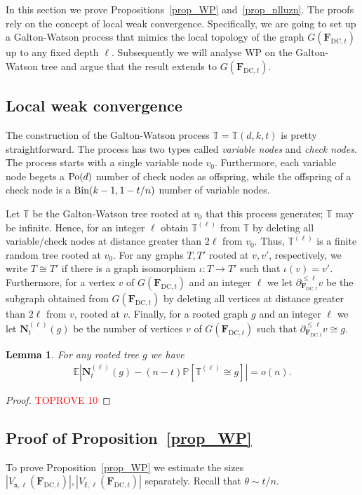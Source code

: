 \documentclass[10pt,reqno]{amsart}
\numberwithin{equation}{section}
\newcommand{\ism}{\cong}
\renewcommand{\vec}[1]{\boldsymbol{#1}}
\newcommand{\FDC}[1]{\PHI_{\mathrm{DC},{#1}}}
\newcommand{\frozen}{\mathtt{f}}
\newcommand{\nll}{\mathtt{n}}
\newcommand{\fzn}{\frozen}
\newcommand{\TT}{\mathbb T}
\newcommand\PHI{\vec F}
\newcommand\vN{\vec N}
\newcommand\Erw{\mathbb{E}}
\newcommand\ex{\Erw}
\newcommand{\Po}{{\rm Po}}
\newcommand{\Bin}{{\rm Bin}}
\newcommand\brk[1]{\left\lbrack{#1}\right\rbrack}
\newcommand\abs[1]{\left|{#1}\right|}
\newcommand\pr{\mathbb{P}}
\newcommand\Prop{Proposition}
\newtheorem{lemma}[definition]{Lemma}
\def\pr{{\mathbb P}}
\begin{document}
\noindent
In this section we prove \Prop s~\ref{prop_WP} and~\ref{prop_nlluzn}.
The proofs rely on the concept of local weak convergence.
Specifically, we are going to set up a Galton-Watson process that mimics the local topology of the graph $G(\FDC t)$ up to any fixed depth $\ell$.
Subsequently we will analyse WP on the Galton-Watson tree and argue that the result extends to $G(\FDC t)$.

\subsection{Local weak convergence}\label{sec_lwc}
The construction of the Galton-Watson process $\TT=\TT(d,k,t)$ is pretty straightforward.
The process has two types called {\em variable nodes} and {\em check nodes}.
The process starts with a single variable node $v_0$.
Furthermore, each variable node begets a $\Po(d)$ number of check nodes as offspring, while the offspring of a check node is a $\Bin(k-1,1-t/n)$ number of variable nodes.

Let $\TT$ be the Galton-Watson tree rooted at $v_0$ that this process generates; $\TT$ may be infinite.
Hence, for an integer $\ell$ obtain $\TT^{(\ell)}$ from $\TT$ by deleting all variable/check nodes at distance greater than $2\ell$ from $v_0$.
Thus, $\TT^{(\ell)}$ is a finite random tree rooted at $v_0$.
For any graphs $T,T'$ rooted at $v,v'$, respectively, we write $T\ism T'$ if there is a graph isomorphism $\iota:T\to T'$ such that $\iota(v)=v'$.
Furthermore, for a vertex $v$ of $G(\FDC{t})$ and an integer $\ell$ we let $\partial^{\leq\ell}_{\FDC t}v$ be the subgraph obtained from $G(\FDC t)$ by deleting all vertices at distance greater than $2\ell$ from $v$, rooted at $v$.
Finally, for a rooted graph $g$ and an integer $\ell$ we let $\vN_t^{(\ell)}(g)$ be the number of vertices $v$ of $G(\FDC{t})$ such that $\partial^{\leq\ell}_{\FDC t}v\ism g$.

\begin{lemma}\label{lem_lwc}
	For any rooted tree $g$ we have
	\begin{align}\label{eq_lem_lwc}
		\ex\abs{\vN_t^{(\ell)}(g)-(n-t)\pr\brk{\TT^{(\ell)}\ism g}}=o(n).
	\end{align}
\end{lemma}
\begin{proof}\textcolor{red}{TOPROVE 10}\end{proof}

\subsection{Proof of \Prop~\ref{prop_WP}}\label{sec_proof_prop_WP}
To prove \Prop~\ref{prop_WP} we estimate the sizes $|V_{\nll,\ell}(\FDC{t})|,|V_{\fzn,\ell}(\FDC{t})|$ separately.
Recall that $\theta \sim t/n$.
\end{document}
